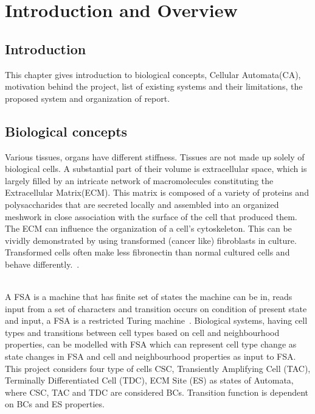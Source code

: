 \chapter{Introduction and Overview}

\section{Introduction}
This chapter gives introduction to biological concepts, Cellular Automata(CA), motivation behind the project, list of existing systems and their limitations, the proposed system and organization of report.

\section{Biological concepts}

Various tissues, organs have different stiffness. Tissues are not made up solely of biological cells.
A substantial part of their volume is extracellular space, which is largely filled by an intricate network of macromolecules constituting the Extracellular Matrix(ECM). 
This matrix is composed of a variety of proteins and polysaccharides that are secreted locally and assembled into an organized meshwork in close association with the surface of the cell that produced them.
The ECM can influence the organization of a cell's cytoskeleton. This can be vividly demonstrated by using transformed (cancer like) fibroblasts in culture. 
Transformed cells often make less fibronectin than normal cultured cells and behave differently.~\cite{MolecularBiologyOfTheCell}.


~\\A FSA is a machine that has finite set of states the machine can be in, reads input from a set of characters and transition occurs on condition of present state and input, 
a FSA is a restricted Turing machine~\cite{FiniteStateMachine}.
Biological systems, having cell types and transitions between cell types based on cell and neighbourhood properties, can be modelled with FSA which can represent cell type change as state changes in FSA and cell and neighbourhood properties as input to FSA.
This project considers four type of cells CSC, Transiently Amplifying Cell (TAC), Terminally Differentiated Cell (TDC), ECM Site (ES) as states of Automata, 
where CSC, TAC and TDC are considered BCs. Transition function is dependent on BCs and ES properties.


